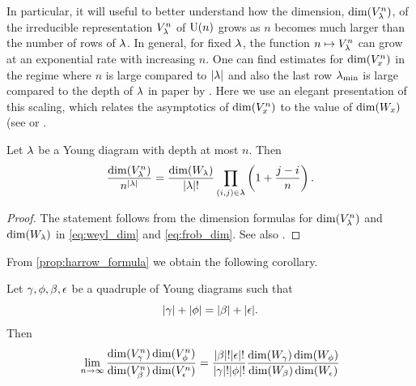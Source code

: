\documentclass[notitlepage, 10pt]{article}
\begin{document}
In particular, it will useful to better understand how the dimension, $\dim(V_{\lambda}^{n})$, of the irreducible representation $V_{\lambda}^{n}$ of $\operatorname{U}(n)$ grows as $n$ becomes much larger than the number of rows of $\lambda$.
In general, for fixed $\lambda$, the function $n \mapsto V_{\lambda}^{n}$ can grow at an exponential rate with increasing $n$.
One can find estimates for $\dim(V_{x}^{n})$ in the regime where $n$ is large compared to ${|\lambda|}$ and also the last row $\lambda_{\min}$ is large compared to the depth of $\lambda$ in paper by  \cite[Section III]{itzykson1966unitary}.
Here we use an elegant presentation of this scaling, which relates the asymptotics of $\dim(V_{x}^{n})$ to the value of $\dim(W_{x})$ (see \cite[Lemma 2]{harrow2023approximate} or \cite[Equations (25,26)]{childs2007weak}.
\begin{prop}
    \label{prop:harrow_formula}
    Let $\lambda$ be a Young diagram with depth at most $n$. Then
    \begin{equation}
        \frac{\dim(V_{\lambda}^{n})}{n^{{|\lambda|}}} = \frac{\dim(W_{\lambda})}{{|\lambda|}!}\prod_{(i,j) \in \lambda} \left(1 + \frac{j-i}{n}\right).
    \end{equation}
\end{prop}
\begin{proof}
    The statement follows from the dimension formulas for $\dim(V_{\lambda}^{n})$ and $\dim(W_{\lambda})$ in \cref{eq:weyl_dim} and \cref{eq:frob_dim}. See also \cite[Appendix A]{harrow2023approximate}.
\end{proof}
From \cref{prop:harrow_formula} we obtain the following corollary.
\begin{cor}
    \label{cor:harrow_ssa_lim}
    Let $\gamma,\phi,\beta,\epsilon$ be a quadruple of Young diagrams such that
    \begin{equation}
        \label{eq:balanced_sizes}
        {|\gamma|}+{|\phi|} = {|\beta|}+{|\epsilon|}.
    \end{equation}
    Then
    \begin{equation}
        \lim_{n\to\infty}
        \frac{\dim(V_{\gamma}^n) \dim(V_{\phi}^n)}{\dim(V_{\beta}^n) \dim(V_{\epsilon}^n)} =
        \frac{{|\beta|}!{|\epsilon|}!}{{|\gamma|}!{|\phi|}!}
        \frac{\dim(W_{\gamma}) \dim(W_{\phi})}{\dim(W_{\beta}) \dim(W_{\epsilon})}
    \end{equation}
\end{cor}
\end{document}
